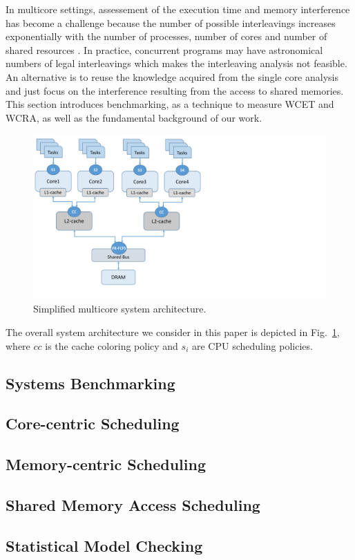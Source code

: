 \label{sec:background}

In multicore settings, assessement of the execution time and memory interference has become a challenge because the number of possible interleavings increases exponentially with the number of processes, number of cores and number of shared resources \cite{Chatto2012}. In practice, concurrent programs may have astronomical numbers of legal interleavings which makes the interleaving analysis not feasible. An alternative is to reuse the knowledge acquired from the single core analysis and just focus on the interference resulting from the access to shared memories. This section introduces benchmarking, as a technique to measure WCET and WCRA, as well as the fundamental background of our work.

\begin{figure}[ht!]
\centering
\caption{Simplified multicore system architecture.}
\label{fig:architecture}
\includegraphics[scale=0.45]{architecture.pdf}
\end{figure}

The overall system architecture we consider in this paper is depicted in Fig.~\ref{fig:architecture}, where $cc$ is the cache coloring policy and $s_i$ are CPU scheduling policies.

\subsection{Systems Benchmarking} 

 
\subsection{Core-centric Scheduling}


\subsection{Memory-centric Scheduling}


\subsection{Shared Memory Access Scheduling}


\subsection{Statistical Model Checking}

